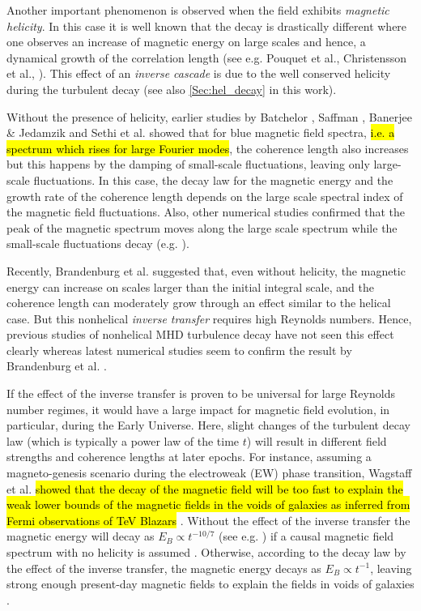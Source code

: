 Another important phenomenon is observed when the field exhibits
\textit{magnetic helicity}. In this case it is well known that the
decay is drastically different where one observes an increase of
magnetic energy on large scales and hence, a dynamical growth of the
correlation length (see e.g. Pouquet et al., Christensson et
al., \cite{Pouquet1976,Christensson01}). This effect of an
\textit{inverse cascade} is due to the well conserved helicity during
the turbulent decay (see also \cref{Sec:hel_decay} in this work).
  
Without the presence of helicity, earlier studies by Batchelor \citep{Batchelor50},
Saffman \citep{Saffman67},  Banerjee \& Jedamzik \citep{Banerjee04} and Sethi et al. \citep{Sethi05} showed that for blue magnetic field spectra, \hl{i.e. a spectrum which rises for large Fourier modes}, the coherence length also increases but this happens 
by the damping of small-scale fluctuations, leaving only large-scale fluctuations.
In this case, the decay law for the magnetic energy and the growth rate of the coherence length
depends on the large scale spectral index of the magnetic field
fluctuations. 
Also, other numerical studies confirmed that
the peak of the magnetic spectrum moves along the large scale spectrum
while the small-scale fluctuations decay
(e.g. \cite{Campanelli07,Saveliev12,Saveliev13}). 

Recently, Brandenburg et al. \cite{Brandenburg15} suggested
that, even without helicity, the magnetic energy can increase on scales
larger than the initial integral scale, and the coherence length can
moderately grow through an effect similar to the helical case. 
But this nonhelical \textit{inverse transfer} requires high Reynolds
numbers. Hence, previous studies of nonhelical MHD turbulence decay
have not seen this effect clearly \citep{MuellerBiskamp99,
  Christensson01, Banerjee04b, Kalelkar04} whereas latest numerical studies seem
to confirm the result by Brandenburg et al.
\cite{Zrake2014,Linkmann16}. 

If the effect of the inverse transfer is proven to be universal for
large Reynolds number regimes, it would have a large impact for
magnetic field evolution, in particular, during the Early
Universe. Here, slight changes of the turbulent decay law (which is
typically a power law of the time $t$) will result in different field
strengths and coherence lengths at later epochs. For instance,
assuming a magneto-genesis scenario during the electroweak (EW) phase
transition, Wagstaff et al. \cite{Wagstaff16} \hl{showed that the
decay of the magnetic field will be too fast to explain the weak lower bounds
of the magnetic fields in the voids of galaxies as inferred from Fermi
observations of TeV Blazars} \cite{Neronov10, Taylor11}. Without the
effect of the inverse transfer the magnetic energy will decay as
$E_B \propto t^{-10/7}$ (see e.g. \cite{Banerjee04b, Sethi05}) if a
causal magnetic field spectrum with no helicity is assumed
\cite{Durrer03}. Otherwise, according to the decay law by the effect
of the inverse transfer, the magnetic energy decays as $E_B \propto
t^{-1}$, leaving strong enough present-day magnetic fields to explain
the fields in voids of galaxies \cite{Kahniashvili13}. 

